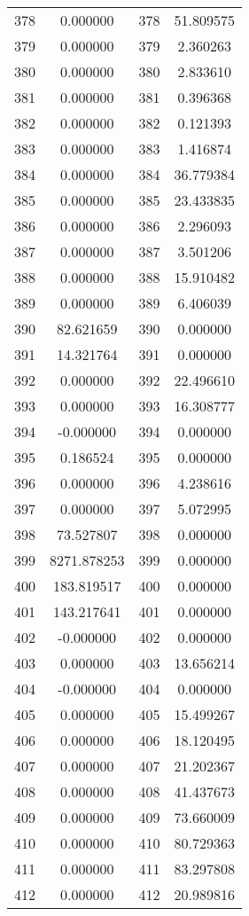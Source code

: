 \documentclass[12pt]{article}
\begin{document}
\begin{longtable}{@{}cccc@{}}
378 & 0.000000 & 378 & 51.809575 \\
379 & 0.000000 & 379 & 2.360263 \\
380 & 0.000000 & 380 & 2.833610 \\
381 & 0.000000 & 381 & 0.396368 \\
382 & 0.000000 & 382 & 0.121393 \\
383 & 0.000000 & 383 & 1.416874 \\
384 & 0.000000 & 384 & 36.779384 \\
385 & 0.000000 & 385 & 23.433835 \\
386 & 0.000000 & 386 & 2.296093 \\
387 & 0.000000 & 387 & 3.501206 \\
388 & 0.000000 & 388 & 15.910482 \\
389 & 0.000000 & 389 & 6.406039 \\
390 & 82.621659 & 390 & 0.000000 \\
391 & 14.321764 & 391 & 0.000000 \\
392 & 0.000000 & 392 & 22.496610 \\
393 & 0.000000 & 393 & 16.308777 \\
394 & -0.000000 & 394 & 0.000000 \\
395 & 0.186524 & 395 & 0.000000 \\
396 & 0.000000 & 396 & 4.238616 \\
397 & 0.000000 & 397 & 5.072995 \\
398 & 73.527807 & 398 & 0.000000 \\
399 & 8271.878253 & 399 & 0.000000 \\
400 & 183.819517 & 400 & 0.000000 \\
401 & 143.217641 & 401 & 0.000000 \\
402 & -0.000000 & 402 & 0.000000 \\
403 & 0.000000 & 403 & 13.656214 \\
404 & -0.000000 & 404 & 0.000000 \\
405 & 0.000000 & 405 & 15.499267 \\
406 & 0.000000 & 406 & 18.120495 \\
407 & 0.000000 & 407 & 21.202367 \\
408 & 0.000000 & 408 & 41.437673 \\
409 & 0.000000 & 409 & 73.660009 \\
410 & 0.000000 & 410 & 80.729363 \\
411 & 0.000000 & 411 & 83.297808 \\
412 & 0.000000 & 412 & 20.989816 \\

\end{longtable}
\end{document}
